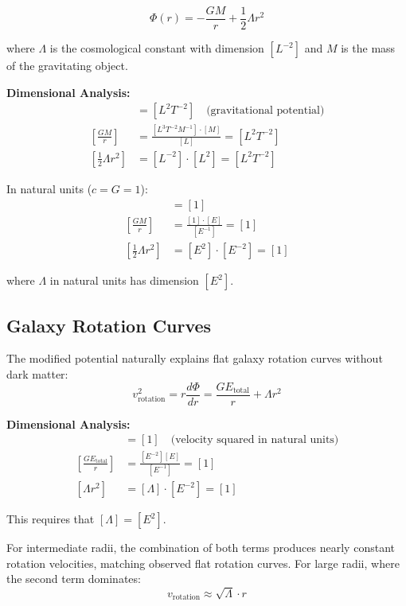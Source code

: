 \documentclass[12pt,a4paper]{report}
\begin{document}
\begin{equation}
	\Phi(r) = -\frac{GM}{r} + \frac{1}{2}\Lambda r^2
	\label{eq:modified_gravitational_potential}
\end{equation}

where $\Lambda$ is the cosmological constant with dimension $[L^{-2}]$ and $M$ is the mass of the gravitating object.

\textbf{Dimensional Analysis:}
\begin{align}
	[\Phi(r)] &= [L^2 T^{-2}] \quad \text{(gravitational potential)} \\
	\left[\frac{GM}{r}\right] &= \frac{[L^3 T^{-2} M^{-1}] \cdot [M]}{[L]} = [L^2 T^{-2}] \\
	\left[\frac{1}{2}\Lambda r^2\right] &= [L^{-2}] \cdot [L^2] = [L^2 T^{-2}]
\end{align}

In natural units ($c = G = 1$):
\begin{align}
	[\Phi(r)] &= [1] \\
	\left[\frac{GM}{r}\right] &= \frac{[1] \cdot [E]}{[E^{-1}]} = [1] \\
	\left[\frac{1}{2}\Lambda r^2\right] &= [E^2] \cdot [E^{-2}] = [1]
\end{align}

where $\Lambda$ in natural units has dimension $[E^2]$.	
\subsection{Galaxy Rotation Curves}
\label{subsec:galaxy_rotation_curves}

The modified potential naturally explains flat galaxy rotation curves without dark matter:
\begin{equation}
	v_{\text{rotation}}^2 = r \frac{d\Phi}{dr} = \frac{GE_{\text{total}}}{r} + \Lambda r^2
\end{equation}

\textbf{Dimensional Analysis:}
\begin{align}
	[v_{\text{rotation}}^2] &= [1] \quad \text{(velocity squared in natural units)} \\
	\left[\frac{GE_{\text{total}}}{r}\right] &= \frac{[E^{-2}][E]}{[E^{-1}]} = [1] \\
	[\Lambda r^2] &= [\Lambda] \cdot [E^{-2}] = [1]
\end{align}

This requires that $[\Lambda] = [E^2]$.

For intermediate radii, the combination of both terms produces nearly constant rotation velocities, matching observed flat rotation curves. For large radii, where the second term dominates:
\begin{equation}
	v_{\text{rotation}} \approx \sqrt{\Lambda} \cdot r
\end{equation}
\end{document}
